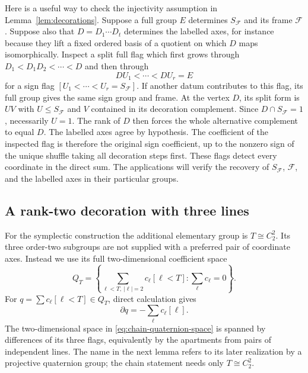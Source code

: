 Here is a useful way to check the injectivity assumption in
Lemma~\ref{lem:decorations}. Suppose a full group $E$ determines
$S_{\mathcal F}$ and its frame $\mathcal F$. Suppose also that
$D=D_1\cdots D_t$ determines the labelled axes, for instance because
they lift a fixed ordered basis of a quotient on which $D$ maps
isomorphically. Inspect a split full flag which first grows through
$D_1<D_1D_2<\cdots<D$ and then through
\[
 DU_1<\cdots<DU_r=E
\]
for a sign flag $[U_1<\cdots<U_r=S_{\mathcal F}]$.
If another datum contributes to this flag, its full group gives
the same sign group and frame. At the vertex $D$, its split form
is $U V$ with $U\leq S_{\mathcal F}$ and $V$ contained in its
decoration complement. Since $D\cap S_{\mathcal F}=1$, necessarily
$U=1$. The rank of $D$ then forces the whole alternative complement
to equal $D$. The labelled axes agree by hypothesis. The coefficient
of the inspected flag is therefore the original sign coefficient,
up to the nonzero sign of the unique shuffle taking all decoration
steps first. These flags detect every coordinate in the direct sum.
The applications will verify the recovery of $S_{\mathcal F}$,
$\mathcal F$, and the labelled axes in their particular groups.

\subsection{A rank-two decoration with three lines}

For the symplectic construction the additional elementary group is
$T\cong C_2^2$. Its three order-two subgroups are not supplied
with a preferred pair of coordinate axes. Instead we use its full
two-dimensional coefficient space
\begin{equation}\label{eq:chain-quaternion-space}
 Q_T=
 \left\{\sum_{\ell<T,\ |\ell|=2}c_\ell[\ell<T]:
             \sum_\ell c_\ell=0\right\}.
\end{equation}
For $q=\sum c_\ell[\ell<T]\in Q_T$, direct calculation gives
\begin{equation}\label{eq:chain-quaternion-boundary}
 \partial q=-\sum_\ell c_\ell[\ell].
\end{equation}
The two-dimensional space in \eqref{eq:chain-quaternion-space}
is spanned by differences of its three flags, equivalently by the
apartments from pairs of independent lines. The name in the next
lemma refers to its later realization by a projective quaternion
group; the chain statement needs only $T\cong C_2^2$.

